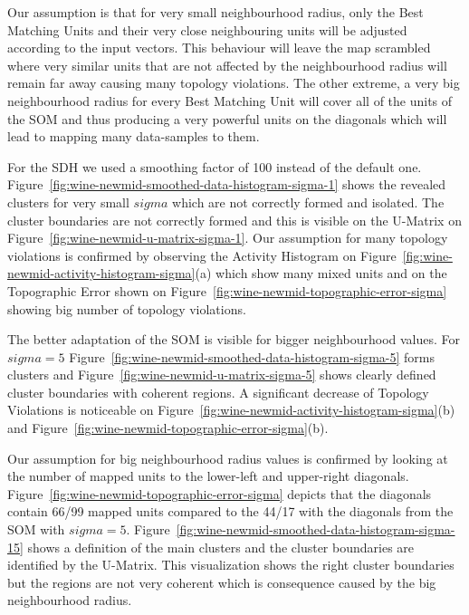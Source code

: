 \documentclass{acm_proc_article-sp}
\begin{document}
Our assumption is that for very small neighbourhood radius, only the Best Matching Units and their very close neighbouring units will be adjusted according to the input vectors. This behaviour will leave the map scrambled where very similar units that are not affected by the neighbourhood radius will remain far away causing many topology violations. The other extreme, a very big neighbourhood radius for every Best Matching Unit will cover all of the units of the SOM and thus producing a very powerful units on the diagonals which will lead to mapping many data-samples to them.

For the SDH we used a smoothing factor of 100 instead of the default one. Figure~\ref{fig:wine-newmid-smoothed-data-histogram-sigma-1} shows the revealed clusters for very small $sigma$ which are not correctly formed and isolated. The cluster boundaries are not correctly formed and this is visible on the U-Matrix on Figure~\ref{fig:wine-newmid-u-matrix-sigma-1}. Our assumption for many topology violations is confirmed by observing the Activity Histogram on Figure~\ref{fig:wine-newmid-activity-histogram-sigma}(a) which show many mixed units and on the Topographic Error shown on Figure~\ref{fig:wine-newmid-topographic-error-sigma} showing big number of topology violations.

The better adaptation of the SOM is visible for bigger neighbourhood values. For $sigma = 5$ Figure~\ref{fig:wine-newmid-smoothed-data-histogram-sigma-5} forms clusters and Figure~\ref{fig:wine-newmid-u-matrix-sigma-5} shows clearly defined cluster boundaries with coherent regions. A significant decrease of Topology Violations is noticeable on Figure~\ref{fig:wine-newmid-activity-histogram-sigma}(b) and Figure~\ref{fig:wine-newmid-topographic-error-sigma}(b).

Our assumption for big neighbourhood radius values is confirmed by looking at the number of mapped units to the lower-left and upper-right diagonals. Figure~\ref{fig:wine-newmid-topographic-error-sigma} depicts that the diagonals contain 66/99 mapped units compared to the 44/17 with the diagonals from the SOM with $sigma=5$. Figure~\ref{fig:wine-newmid-smoothed-data-histogram-sigma-15} shows a definition of the main clusters and the cluster boundaries are identified by the U-Matrix. This visualization shows the right cluster boundaries but the regions are not very coherent which is consequence caused by the big neighbourhood radius.
\end{document}
